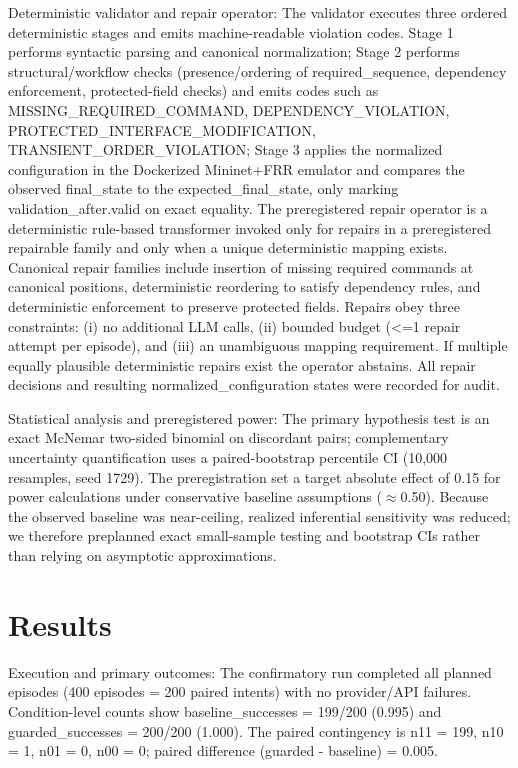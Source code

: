 \documentclass[conference]{IEEEtran}
\begin{document}
Deterministic validator and repair operator: The validator executes three ordered deterministic stages and emits machine-readable violation codes. Stage 1 performs syntactic parsing and canonical normalization; Stage 2 performs structural/workflow checks (presence/ordering of required\_sequence, dependency enforcement, protected-field checks) and emits codes such as MISSING\_REQUIRED\_COMMAND, DEPENDENCY\_VIOLATION, PROTECTED\_INTERFACE\_MODIFICATION, TRANSIENT\_ORDER\_VIOLATION; Stage 3 applies the normalized configuration in the Dockerized Mininet+FRR emulator and compares the observed final\_state to the expected\_final\_state, only marking validation\_after.valid on exact equality. The preregistered repair operator is a deterministic rule-based transformer invoked only for repairs in a preregistered repairable family and only when a unique deterministic mapping exists. Canonical repair families include insertion of missing required commands at canonical positions, deterministic reordering to satisfy dependency rules, and deterministic enforcement to preserve protected fields. Repairs obey three constraints: (i) no additional LLM calls, (ii) bounded budget (<=1 repair attempt per episode), and (iii) an unambiguous mapping requirement. If multiple equally plausible deterministic repairs exist the operator abstains. All repair decisions and resulting normalized\_configuration states were recorded for audit.

Statistical analysis and preregistered power: The primary hypothesis test is an exact McNemar two-sided binomial on discordant pairs; complementary uncertainty quantification uses a paired-bootstrap percentile CI (10,000 resamples, seed 1729). The preregistration set a target absolute effect of 0.15 for power calculations under conservative baseline assumptions (\ensuremath{\approx}0.50). Because the observed baseline was near-ceiling, realized inferential sensitivity was reduced; we therefore preplanned exact small-sample testing and bootstrap CIs rather than relying on asymptotic approximations.

\section{Results}
Execution and primary outcomes: The confirmatory run completed all planned episodes (400 episodes = 200 paired intents) with no provider/API failures. Condition-level counts show baseline\_successes = 199/200 (0.995) and guarded\_successes = 200/200 (1.000). The paired contingency is n11 = 199, n10 = 1, n01 = 0, n00 = 0; paired difference (guarded - baseline) = 0.005.
\end{document}
